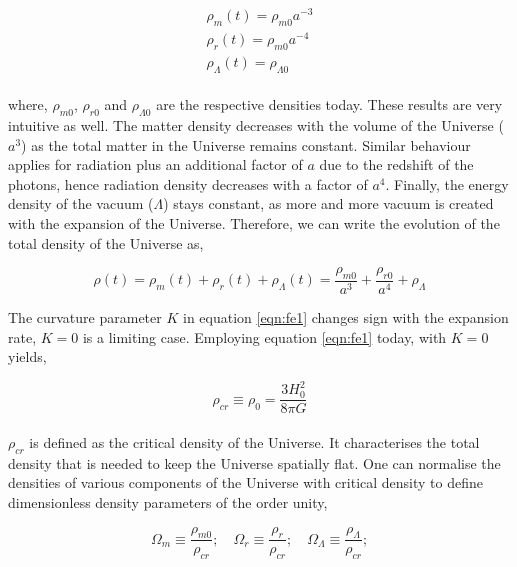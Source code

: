 \begin{equation}
\begin{array}{l}
\rho_m(t) = \rho_{m0} a^{-3} \\
\rho_r(t) = \rho_{m0} a^{-4} \\
\rho_{\Lambda}(t) = \rho_{\Lambda 0}

\end{array} 
\label{eq:xdef}
\end{equation}
\\ 
where, $\rho_{m0}$, $\rho_{r0}$ and $\rho_{\Lambda 0}$ are the respective densities
today. These results are very intuitive as well. The matter density decreases with the volume 
of the Universe ($a^3$) as the total matter in the Universe remains constant. Similar
behaviour applies for radiation plus an additional factor of $a$ due to the redshift
of the photons, hence radiation density decreases with a factor of $a^4$. Finally, the
energy density of the vacuum ($\Lambda$) stays constant, 
as more and more vacuum is created with the expansion of the Universe. Therefore,
we can write the evolution of the total density of the Universe as,

\begin{equation}
	\rho(t) = \rho_m(t)+\rho_r(t)+\rho_{\Lambda}(t) = \dfrac{\rho_{m0}}{a^3} + 
				\dfrac{\rho_{r0}}{a^4} + \rho_{\Lambda}
	\label{eqn:dens}
\end{equation}



The curvature parameter $K$ in equation \ref{eqn:fe1} changes sign with the expansion 
rate, $K=0$ is a limiting case. Employing equation \ref{eqn:fe1} today, with
$K=0$ yields,

\begin{equation}
	\rho_{cr} \equiv \rho_0 = \dfrac{3H_0^2}{8\pi G}
\end{equation}
\\
$\rho_{cr}$ is defined as the critical density of the Universe. 
It characterises the total density
that is needed to keep the Universe spatially flat. One can normalise the densities of
various components of the Universe with critical density to define dimensionless density
parameters of the order unity,

\begin{equation}
	\Omega_m \equiv \dfrac{\rho_{m0}}{\rho_{cr}};\quad
	\Omega_r \equiv \dfrac{\rho_{r}}{\rho_{cr}};\quad
	\Omega_{\Lambda} \equiv \dfrac{\rho_{\Lambda}}{\rho_{cr}};
	\label{eqn:Omega}
\end{equation}

